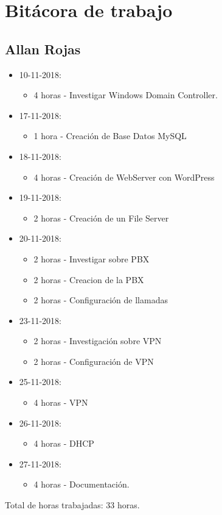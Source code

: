 \documentclass{article}
\begin{document}
\section{Bit\'acora de trabajo}
\subsection{Allan Rojas}
\begin{itemize}
  \item 10-11-2018:
  \begin{itemize}
    \item 4 horas - Investigar Windows Domain Controller.
  \end{itemize}
  \item 17-11-2018:
  \begin{itemize}
    \item 1 hora - Creaci\'on de Base Datos MySQL
  \end{itemize}
  \item 18-11-2018:
  \begin{itemize}
    \item 4 horas - Creaci\'on de WebServer con WordPress
  \end{itemize}
  \item 19-11-2018:
  \begin{itemize}
    \item 2 horas - Creaci\'on de un File Server
  \end{itemize}
  \item 20-11-2018:
  \begin{itemize}
    \item 2 horas - Investigar sobre PBX
    \item 2 horas - Creacion de la PBX
    \item 2 horas - Configuraci\'on de llamadas
  \end{itemize}
  \item 23-11-2018:
  \begin{itemize}
    \item 2 horas - Investigaci\'on sobre VPN
    \item 2 horas - Configuraci\'on de VPN
  \end{itemize}
  \item 25-11-2018:
  \begin{itemize}
    \item 4 horas - VPN
  \end{itemize}
  \item 26-11-2018:
  \begin{itemize}
    \item 4 horas - DHCP
  \end{itemize}
  \item 27-11-2018:
  \begin{itemize}
    \item 4 horas - Documentaci\'on.
  \end{itemize}
\end{itemize}
Total de horas trabajadas: 33 horas.
\end{document}
